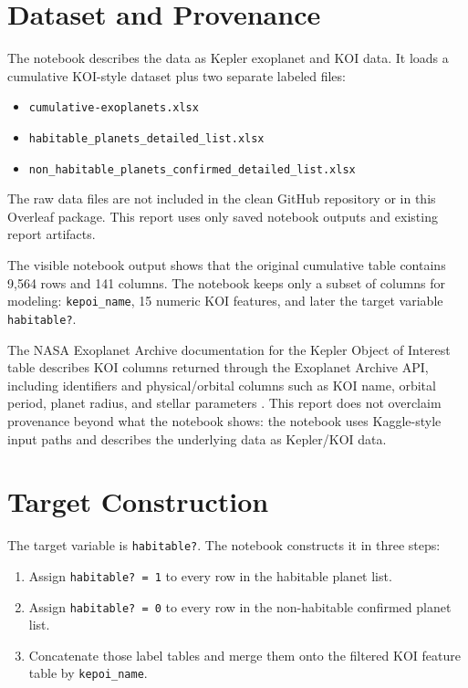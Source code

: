 \documentclass[11pt]{article}
\begin{document}
\section{Dataset and Provenance}

The notebook describes the data as Kepler exoplanet and KOI data. It loads a cumulative KOI-style dataset plus two separate labeled files:

\begin{itemize}
  \item \texttt{cumulative-exoplanets.xlsx}
  \item \texttt{habitable\_planets\_detailed\_list.xlsx}
  \item \texttt{non\_habitable\_planets\_confirmed\_detailed\_list.xlsx}
\end{itemize}

The raw data files are not included in the clean GitHub repository or in this Overleaf package. This report uses only saved notebook outputs and existing report artifacts.

The visible notebook output shows that the original cumulative table contains 9,564 rows and 141 columns. The notebook keeps only a subset of columns for modeling: \texttt{kepoi\_name}, 15 numeric KOI features, and later the target variable \texttt{habitable?}.

The NASA Exoplanet Archive documentation for the Kepler Object of Interest table describes KOI columns returned through the Exoplanet Archive API, including identifiers and physical/orbital columns such as KOI name, orbital period, planet radius, and stellar parameters \cite{nasaKoiColumns}. This report does not overclaim provenance beyond what the notebook shows: the notebook uses Kaggle-style input paths and describes the underlying data as Kepler/KOI data.

\section{Target Construction}

The target variable is \texttt{habitable?}. The notebook constructs it in three steps:

\begin{enumerate}
  \item Assign \texttt{habitable? = 1} to every row in the habitable planet list.
  \item Assign \texttt{habitable? = 0} to every row in the non-habitable confirmed planet list.
  \item Concatenate those label tables and merge them onto the filtered KOI feature table by \texttt{kepoi\_name}.
\end{enumerate}
\end{document}
